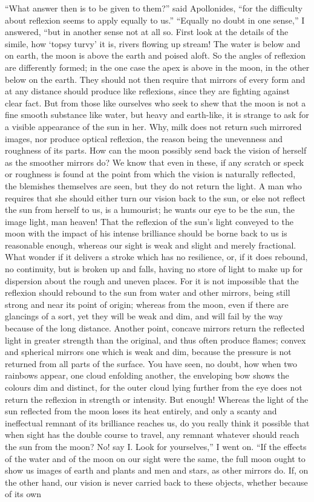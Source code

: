 \documentclass[a4paper, 11pt, oneside, polutonikogreek, english]{article}
\begin{document}
``What answer then is to be given to them?'' said Apollonides, ``for the difficulty about reflexion seems to apply equally to us.'' ``Equally no doubt in one sense,'' I answered, ``but in another sense not at all so. First look at the details of the simile, how `topsy turvy' it is, rivers flowing up stream! The water is below and on earth, the moon is above the earth and poised aloft. So the angles of reflexion are differently formed; in the one case the apex is above in the moon, in the other below on the earth. They should not then require that mirrors of every form and at any distance should produce like reflexions, since they are fighting against clear fact. But from those like ourselves who seek to shew that the moon is not a fine smooth substance like water, but heavy and earth-like, it is strange to ask for a visible appearance of the sun in her. Why, milk does not return such mirrored images, nor produce optical reflexion, the reason being the unevenness and roughness of its parts. How can the moon possibly send back the vision of herself as the smoother mirrors do? We know that even in these, if any scratch or speck or roughness is found at the point from which the vision is naturally reflected, the blemishes themselves are seen, but they do not return the light. A man who requires that she should either turn our vision back to the sun, or else not reflect the sun from herself to us, is a humourist; he wants our eye to be the sun, the image light, man heaven! That the reflexion of the sun's light conveyed to the moon with the impact of his intense brilliance should be borne back to us is reasonable enough, whereas our sight is weak and slight and merely fractional. What wonder if it delivers a stroke which has no resilience, or, if it does rebound, no continuity, but is broken up and falls, having no store of light to make up for dispersion about the rough and uneven places. For it is not impossible that the reflexion should rebound to the sun from water and other mirrors, being still strong and near its point of origin; whereas from the moon, even if there are glancings of a sort, yet they will be weak and dim, and will fail by the way because of the long distance. Another point, concave mirrors return the reflected light in greater strength than the original, and thus often produce flames; convex and spherical mirrors one which is weak and dim, because the pressure is not returned from all parts of the surface. You have seen, no doubt, how when two rainbows appear, one cloud enfolding another, the enveloping bow shows the colours dim and distinct, for the outer cloud lying further from the eye does not return the reflexion in strength or intensity. But enough! Whereas the light of the sun reflected from the moon loses its heat entirely, and only a scanty and ineffectual remnant of its brilliance reaches us, do you really think it possible that when sight has the double course to travel, any remnant whatever should reach the sun from the moon? No! say I. Look for yourselves,'' I went on. ``If the effects of the water and of the moon on our sight were the same, the full moon ought to show us images of earth and plants and men and stars, as other mirrors do. If, on the other hand, our vision is never carried back to these objects, whether because of its own 
\end{document}
